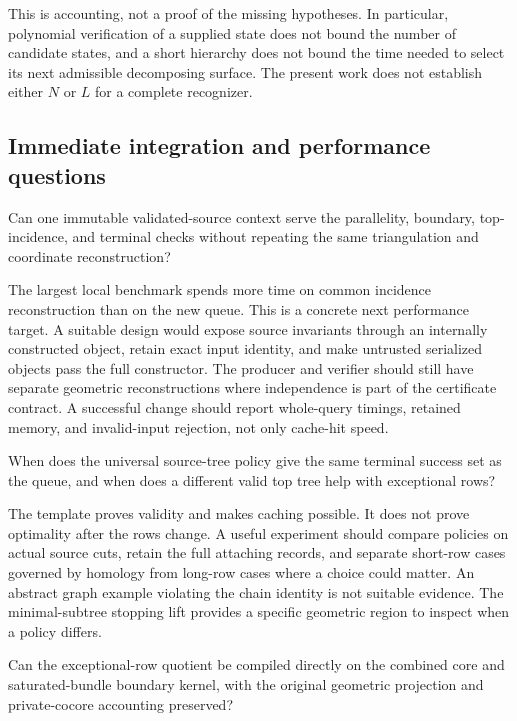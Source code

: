This is accounting, not a proof of the missing hypotheses. In particular,
polynomial verification of a supplied state does not bound the number of
candidate states, and a short hierarchy does not bound the time needed to
select its next admissible decomposing surface. The present work does not
establish either $N$ or $L$ for a complete recognizer.

\subsection{Immediate integration and performance questions}

\begin{question}
Can one immutable validated-source context serve the parallelity, boundary,
top-incidence, and terminal checks without repeating the same triangulation
and coordinate reconstruction?
\end{question}

The largest local benchmark spends more time on common incidence
reconstruction than on the new queue. This is a concrete next performance
target. A suitable design would expose source invariants through an
internally constructed object, retain exact input identity, and make
untrusted serialized objects pass the full constructor. The producer and
verifier should still have separate geometric reconstructions where
independence is part of the certificate contract. A successful change
should report whole-query timings, retained memory, and invalid-input
rejection, not only cache-hit speed.

\begin{question}
When does the universal source-tree policy give the same terminal success
set as the queue, and when does a different valid top tree help with
exceptional rows?
\end{question}

The template proves validity and makes caching possible. It does not prove
optimality after the rows change. A useful experiment should compare
policies on actual source cuts, retain the full attaching records, and
separate short-row cases governed by homology from long-row cases where a
choice could matter. An abstract graph example violating the chain identity
is not suitable evidence. The minimal-subtree stopping lift provides a
specific geometric region to inspect when a policy differs.

\begin{question}
Can the exceptional-row quotient be compiled directly on the combined
core and saturated-bundle boundary kernel, with the original geometric
projection and private-cocore accounting preserved?
\end{question}

